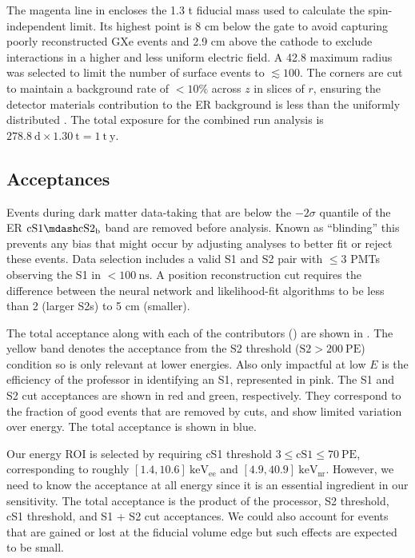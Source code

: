 The magenta line in  encloses the 1.3 t fiducial mass used to calculate the spin-independent
limit.  Its highest point is 8 cm below the gate to avoid capturing poorly reconstructed GXe events and 2.9 cm above the cathode to
exclude interactions in a higher and less uniform electric field.  A 42.8 maximum radius was selected to limit the number of surface
events to $\lesssim 100$.  The corners are cut to maintain a background rate of $< 10\%$ across
$z$ in slices of $r$, ensuring the detector materials contribution to the ER background is less than the uniformly distributed
.  The total exposure for the combined run analysis is $278.8\ \mathrm{d} \times 1.30\ \mathrm{t} = 1\ \mathrm{t\ y}$.



\subsection{Acceptances}
\label{subsec:dark_matter_results_selection}
Events during dark matter data-taking that are below the $-2 \sigma$ quantile of the ER $\mathrm{cS1} \mdash \mathrm{cS2_b}$ band are
removed before analysis.  Known as ``blinding'' this prevents any bias that might occur by adjusting analyses to better fit or reject
these events.  Data selection includes a valid S1 and S2 pair with $\leq 3$ PMTs observing the S1 in $< 100\ \mathrm{ns}$.  A position
reconstruction cut requires the difference between the neural network and likelihood-fit algorithms to be less than 2 (larger S2s) to 5
cm (smaller).

The total acceptance along with each of the contributors () are shown in
.  The yellow band denotes the acceptance from the S2 threshold
($\mathrm{S2} > 200\ \mathrm{PE}$) condition so is only relevant at lower energies.  Also only impactful at low $E$ is the efficiency of
the professor in identifying an S1, represented in pink.  The S1 and S2 cut acceptances are shown in red and green, respectively.  They
correspond to the fraction of good events that are removed by cuts, and show limited variation over energy.  The total acceptance is
shown in blue.

Our energy ROI is selected by requiring cS1 threshold $3 \leq \mathrm{cS1} \leq 70\ \mathrm{PE}$, corresponding to roughly
$[1.4, 10.6]\ \mathrm{keV_{ee}}$ and $[4.9, 40.9]\ \mathrm{keV_{nr}}$.  However, we need to know the acceptance at all energy since it is
an essential ingredient in our sensitivity.  The total acceptance is the product of the processor, S2 threshold, cS1 threshold, and
S1 + S2 cut acceptances.  We could also account for events that are gained or lost at the fiducial volume edge but such effects are
expected to be small.

